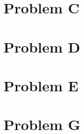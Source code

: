 \documentclass[10pt]{article}
\begin{document}
\newpage



\section*{Problem C}



\newpage



\section*{Problem D}



\newpage



\section*{Problem E}



\newpage



\section*{Problem G}



\newpage
\end{document}
